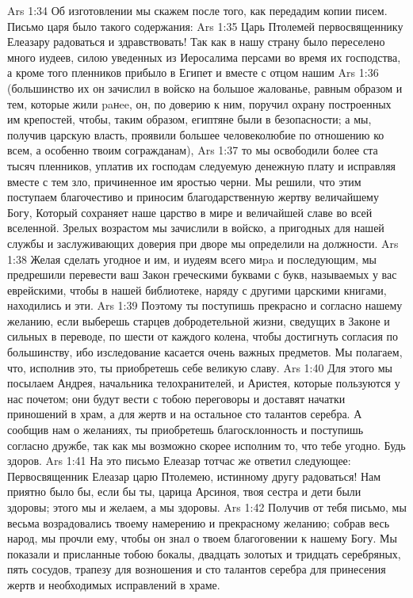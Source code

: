 \vs Ars 1:34
Об изготовлении мы скажем после того, как передадим копии писем. Письмо царя было такого содержания:
\vs Ars 1:35
Царь Птолемей первосвященнику Елеазару радоваться и здравствовать!
Так как в нашу страну было переселено много иудеев, силою уведенных из Иеросалима персами во время их господства, а кроме того пленников прибыло в Египет и вместе с отцом нашим
\vs Ars 1:36
(большинство их он зачислил в войско на большое жалованье, равным образом и тем, которые жили paнee, он, по доверию к ним, поручил охрану построенных им крепостей, чтобы, таким образом, египтяне были в безопасности; а мы, получив царскую власть, проявили большее человеколюбие по отношению ко всем, а особенно твоим согражданам),
\vs Ars 1:37
то мы освободили более ста тысяч пленников, уплатив их господам следуемую денежную плату и исправляя вместе с тем зло, причиненное им яростью черни. Мы решили, что этим поступаем благочестиво и приносим благодарственную жертву величайшему Богу, Который сохраняет наше царство в мире и величайшей славе во всей вселенной. Зрелых возрастом мы зачислили в войско, а пригодных для нашей службы и заслуживающих доверия при дворе мы определили на должности.
\vs Ars 1:38
Желая сделать угодное и им, и иудеям всего миpa и последующим, мы предрешили перевести ваш Закон греческими буквами с букв, называемых у вас еврейскими, чтобы в нашей библиотеке, наряду с другими царскими книгами, находились и эти.
\vs Ars 1:39
Поэтому ты поступишь прекрасно и согласно нашему желанию, если выберешь старцев добродетельной жизни, сведущих в Законе и сильных в переводе, по шести от каждого колена, чтобы достигнуть согласия по большинству, ибо изследование касается очень важных предметов. Мы полагаем, что, исполнив это, ты приобретешь себе великую славу.
\vs Ars 1:40
Для этого мы посылаем Андрея, начальника телохранителей, и Аристея, которые пользуются у нас почетом; они будут вести с тобою переговоры и доставят начатки приношений в храм, а для жертв и на остальное сто талантов серебра. А сообщив нам о желаниях, ты приобретешь благосклонность и поступишь согласно дружбе, так как мы возможно скорее исполним то, что тебе угодно. Будь здоров.
\vs Ars 1:41
На это письмо Елеазар тотчас же ответил следующее:
Первосвященник Елеазар царю Птолемею, истинному другу радоваться!
Нам приятно было бы, если бы ты, царица Арсиноя, твоя сестра и дети были здоровы; этого мы и желаем, а мы здоровы.
\vs Ars 1:42
Получив от тебя письмо, мы весьма возрадовались твоему намерению и прекрасному желанию; собрав весь народ, мы прочли ему, чтобы он знал о твоем благоговении к нашему Богу. Мы показали и присланные тобою бокалы, двадцать золотых и тридцать серебряных, пять сосудов, трапезу для возношения и сто талантов серебра для принесения жертв и необходимых исправлений в храме.
